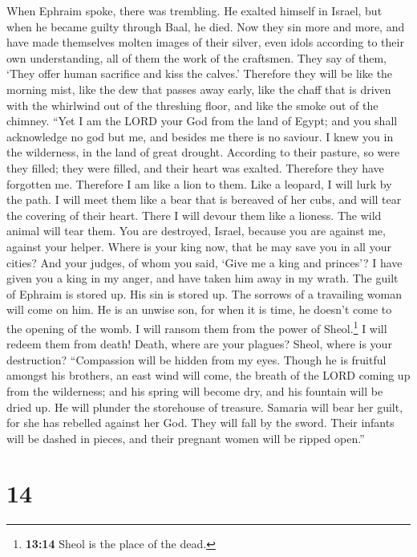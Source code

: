  When Ephraim spoke, there was trembling. He exalted
himself in Israel, but when he became guilty through Baal, he died.
 Now they sin more and more, and have made themselves
molten images of their silver, even idols according to their own
understanding, all of them the work of the craftsmen. They say of them,
`They offer human sacrifice and kiss the calves.' 
Therefore they will be like the morning mist, like the dew that passes
away early, like the chaff that is driven with the whirlwind out of the
threshing floor, and like the smoke out of the chimney. 
``Yet I am the LORD your God from the land of Egypt; and you shall
acknowledge no god but me, and besides me there is no saviour.
 I knew you in the wilderness, in the land of great
drought.  According to their pasture, so were they filled;
they were filled, and their heart was exalted. Therefore they have
forgotten me.  Therefore I am like a lion to them. Like a
leopard, I will lurk by the path.  I will meet them like a
bear that is bereaved of her cubs, and will tear the covering of their
heart. There I will devour them like a lioness. The wild animal will
tear them.  You are destroyed, Israel, because you are
against me, against your helper.  Where is your king now,
that he may save you in all your cities? And your judges, of whom you
said, `Give me a king and princes'?  I have given you a
king in my anger, and have taken him away in my wrath. 
The guilt of Ephraim is stored up. His sin is stored up. 
The sorrows of a travailing woman will come on him. He is an unwise son,
for when it is time, he doesn't come to the opening of the womb.
 I will ransom them from the power of Sheol.\footnote{\textbf{13:14}
  Sheol is the place of the dead.} I will redeem them from death! Death,
where are your plagues? Sheol, where is your destruction? ``Compassion
will be hidden from my eyes.  Though he is fruitful
amongst his brothers, an east wind will come, the breath of the LORD
coming up from the wilderness; and his spring will become dry, and his
fountain will be dried up. He will plunder the storehouse of treasure.
 Samaria will bear her guilt, for she has rebelled
against her God. They will fall by the sword. Their infants will be
dashed in pieces, and their pregnant women will be ripped open.''

\hypertarget{section-8}{%
\section{14}\label{section-8}}

